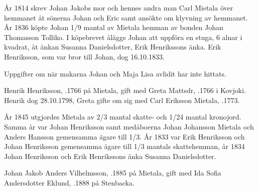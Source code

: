 År 1814 skrev Johan Jakobs mor och hennes andra man Carl Mietala över hemmanet åt sönerna Johan och Eric samt ansökte om klyvning av hemmanet. År 1836 köpte Johan 1/9 mantal av Mietala hemman av bonden Johan Thomasson Tolliko. I köpebrevet åläggs Johan att uppföra en stuga, 6 alnar i kvadrat, åt änkan Susanna Danielsdotter, Erik Henrikssons änka. Erik Henriksson, som var bror till Johan, dog 16.10.1833.

Uppgifter om när makarna Johan och Maja Lisa avlidit har inte hittats.


%
Henrik Henriksson, .1766 på Mietala, gift med Greta Mattsdr, .1766 i Kovjoki. Henrik dog 28.10.1798, Greta gifte om sig med Carl Eriksson Mietala, .1773.
\begin{jhchildren}
  \item {}
  \item {}
  \item {}
  \item {}
  \item {}
  \item {}
  \item {}
\end{jhchildren}

År 1845 utgjordes Mietala av 2/3 mantal skatte- och 1/24 mantal kronojord. Samma år var Johan Henriksson samt medåboerna Johan Johansson Mietala och Anders Hansson gemensamma ägare till 1/3. År 1833 var Erik Henriksson och Johan Henriksson gemensamma ägare till 1/3 mantals skattehemman, år 1834 Johan Henriksson och Erik Henrikssons änka Susanna Danielsdotter.



%


%
Johan Jakob Anders Vilhelmsson, .1885 på Mietala, gift med Ida Sofia Andersdotter Eklund, .1888 på Stenbacka.
\begin{jhchildren}
  \item {}
  \item {}
  \item {}
\end{jhchildren}


